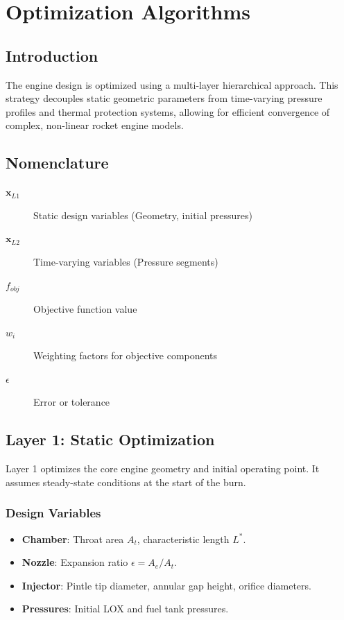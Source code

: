 \section{Optimization Algorithms}

\subsection{Introduction}
The engine design is optimized using a multi-layer hierarchical approach. This strategy decouples static geometric parameters from time-varying pressure profiles and thermal protection systems, allowing for efficient convergence of complex, non-linear rocket engine models.

\subsection{Nomenclature}
\begin{description}
    \item[\(\mathbf{x}_{L1}\)] Static design variables (Geometry, initial pressures)
    \item[\(\mathbf{x}_{L2}\)] Time-varying variables (Pressure segments)
    \item[\(f_{obj}\)] Objective function value
    \item[\(w_i\)] Weighting factors for objective components
    \item[\(\epsilon\)] Error or tolerance
\end{description}

\subsection{Layer 1: Static Optimization}
Layer 1 optimizes the core engine geometry and initial operating point. It assumes steady-state conditions at the start of the burn.

\subsubsection{Design Variables}
\begin{itemize}
    \item \textbf{Chamber}: Throat area \(A_t\), characteristic length \(L^*\).
    \item \textbf{Nozzle}: Expansion ratio \(\epsilon = A_e/A_t\).
    \item \textbf{Injector}: Pintle tip diameter, annular gap height, orifice diameters.
    \item \textbf{Pressures}: Initial LOX and fuel tank pressures.
\end{itemize}

